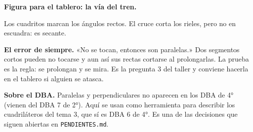 \documentclass[11pt]{article}
\begin{document}
\textbf{Figura para el tablero: la vía del tren.}

\begin{center}

{\small Los cuadritos marcan los ángulos rectos. El cruce corta los rieles, pero no en
escuadra: es secante.}
\end{center}

\begin{nota}
\textbf{El error de siempre.} «No se tocan, entonces son paralelas.» Dos segmentos cortos
pueden no tocarse y aun así sus rectas cortarse al prolongarlas. La prueba es la regla: se
prolongan y se mira. Es la pregunta 3 del taller y conviene hacerla en el tablero si alguien
se atasca.
\end{nota}

\begin{nota}
\textbf{Sobre el DBA.} Paralelas y perpendiculares no aparecen en los DBA de 4° (vienen del
DBA 7 de 2°). Aquí se usan como herramienta para describir los cuadriláteros del tema 3, que sí
es DBA 6 de 4°. Es una de las decisiones que siguen abiertas en \texttt{PENDIENTES.md}.
\end{nota}
\end{document}
